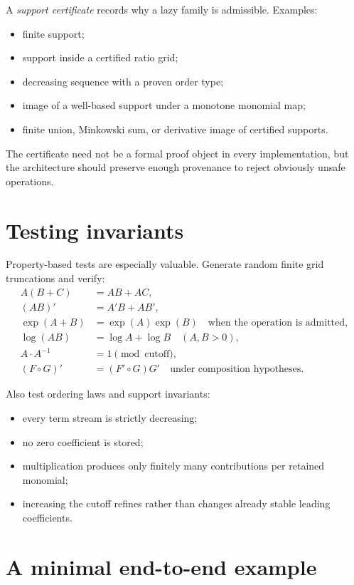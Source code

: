\documentclass[11pt,openany]{book}
\theoremstyle{definition}
\theoremstyle{plain}
\theoremstyle{remark}
\begin{document}
A \emph{support certificate} records why a lazy family is admissible. Examples:
\begin{itemize}
 \item finite support;
 \item support inside a certified ratio grid;
 \item decreasing sequence with a proven order type;
 \item image of a well-based support under a monotone monomial map;
 \item finite union, Minkowski sum, or derivative image of certified supports.
\end{itemize}

The certificate need not be a formal proof object in every implementation, but the architecture should preserve enough provenance to reject obviously unsafe operations.

\section{Testing invariants}

Property-based tests are especially valuable. Generate random finite grid truncations and verify:
\begin{align*}
 A(B+C)&=AB+AC,\\
 (AB)'&=A'B+AB',\\
 \exp(A+B)&=\exp(A)\exp(B)
 \quad\text{when the operation is admitted},\\
 \log(AB)&=\log A+\log B
 \quad(A,B>0),\\
 A\cdot A^{-1}&=1\pmod{\text{cutoff}},\\
 (F\circ G)'&=(F'\circ G)G'
 \quad\text{under composition hypotheses}.
\end{align*}

Also test ordering laws and support invariants:
\begin{itemize}
 \item every term stream is strictly decreasing;
 \item no zero coefficient is stored;
 \item multiplication produces only finitely many contributions per retained monomial;
 \item increasing the cutoff refines rather than changes already stable leading coefficients.
\end{itemize}

\section{A minimal end-to-end example}
\end{document}

